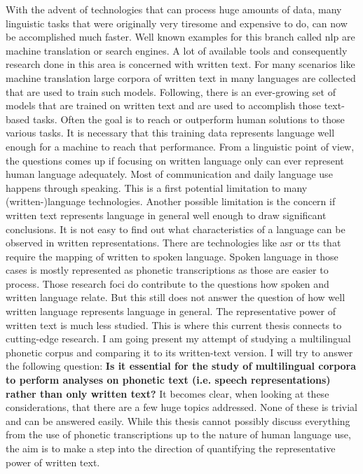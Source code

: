 
\label{chap:1_intro}

With the advent of technologies that can process huge amounts of data, many linguistic tasks that were originally very tiresome and expensive to do, can now be accomplished much faster. Well known examples for this branch called \ac{nlp} are machine translation or search engines. A lot of available tools and consequently research done in this area is concerned with written text. For many scenarios like machine translation large corpora of written text in many languages are collected that are used to train such models. Following, there is an ever-growing set of models that are trained on written text and are used to accomplish those text-based tasks. Often the goal is to reach or outperform human solutions to those various tasks. It is necessary that this training data represents language well enough for a machine to reach that performance. From a linguistic point of view, the questions comes up if focusing on written language only can ever represent human language adequately. Most of communication and daily language use happens through speaking. This is a first potential limitation to many (written-)language technologies. Another possible limitation is the concern if written text represents language in general well enough to draw significant conclusions. It is not easy to find out what characteristics of a language can be observed in written representations. There are technologies like \ac{asr} or \ac{tts} that require the mapping of written to spoken language. Spoken language in those cases is mostly represented as phonetic transcriptions as those are easier to process. Those research foci do contribute to the questions how spoken and written language relate. But this still does not answer the question of how well written language represents language in general. The representative power of written text is much less studied. This is where this current thesis connects to cutting-edge research. I am going present my attempt of studying a multilingual phonetic corpus and comparing it to its written-text version. I will try to answer the following question: \textbf{Is it essential for the study of multilingual corpora to perform analyses on phonetic text (i.e. speech representations) rather than only written text?} It becomes clear, when looking at these considerations, that there are a few huge topics addressed. None of these is trivial and can be answered easily. While this thesis cannot possibly discuss everything from the use of phonetic transcriptions up to the nature of human language use, the aim is to make a step into the direction of quantifying the representative power of written text. 


